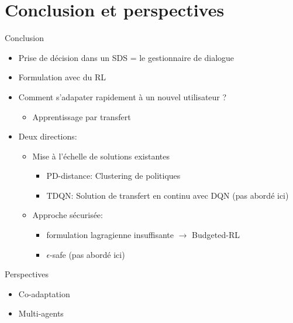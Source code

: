 \documentclass[french]{beamer}
\begin{document}
    \section{Conclusion et perspectives}
    \begin{frame}{Conclusion}
        \begin{itemize}
            \item Prise de décision dans un SDS = le gestionnaire de dialogue
            \item Formulation avec du RL
            \item Comment s'adapater rapidement à un nouvel utilisateur ?
            \begin{itemize}
                \item Apprentissage par transfert
            \end{itemize}
            \item Deux directions:
            \begin{itemize}
                \item Mise à l'échelle de solutions existantes
                \begin{itemize}
                    \item PD-distance: Clustering de politiques
                    \item TDQN: Solution de transfert en continu avec DQN (pas abordé ici)
                \end{itemize}
                \item Approche sécurisée:
                \begin{itemize}
                    \item formulation lagragienne insuffisante $\rightarrow$ Budgeted-RL
                    \item $\epsilon$-safe (pas abordé ici)
                \end{itemize}
            \end{itemize}
        \end{itemize}
    \end{frame}

    \begin{frame}{Perspectives}
        \begin{itemize}
            \item Co-adaptation
            \item Multi-agents
        \end{itemize}

    \end{frame}

\end{document}

